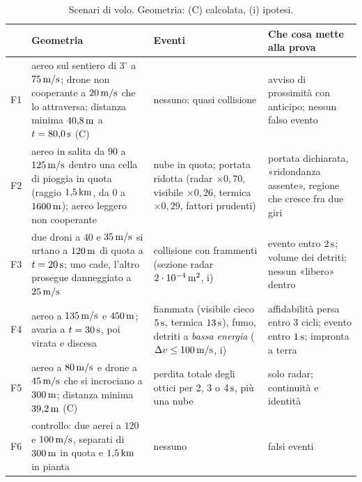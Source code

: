 \begin{table}[H]\centering\footnotesize
\caption{Scenari di volo. Geometria: (C) calcolata, (i) ipotesi.}\label{tab:vo-scenari}
\begin{tabularx}{\linewidth}{@{}p{0.6cm}>{\RaggedRight\arraybackslash}p{6.4cm}>{\RaggedRight\arraybackslash}p{3.2cm}L@{}}
\toprule
& Geometria & Eventi & Che cosa mette alla prova\\
\midrule
F1 & aereo sul sentiero di $3^\circ$ a $75\,\mathrm{m/s}$; drone non cooperante a $20\,\mathrm{m/s}$ che lo attraversa; distanza minima $40{,}8\,\mathrm{m}$ a $t=80{,}0\,\mathrm{s}$ (C) & nessuno: quasi collisione & avviso di prossimità con anticipo; nessun falso evento\\
F2 & aereo in salita da $90$ a $125\,\mathrm{m/s}$ dentro una cella di pioggia in quota (raggio $1{,}5\,\mathrm{km}$, da $0$ a $1600\,\mathrm{m}$); aereo leggero non cooperante & nube in quota; portata ridotta (radar $\times0{,}70$, visibile $\times0{,}26$, termica $\times0{,}29$, fattori prudenti) & portata dichiarata, «ridondanza assente», regione che cresce fra due giri\\
F3 & due droni a $40$ e $35\,\mathrm{m/s}$ si urtano a $120\,\mathrm{m}$ di quota a $t=20\,\mathrm{s}$; uno cade, l'altro prosegue danneggiato a $25\,\mathrm{m/s}$ & collisione con frammenti (sezione radar $2\cdot10^{-4}\,\mathrm{m^2}$, i) & evento entro $2\,\mathrm{s}$; volume dei detriti; nessun «libero» dentro\\
F4 & aereo a $135\,\mathrm{m/s}$ e $450\,\mathrm{m}$; avaria a $t=30\,\mathrm{s}$, poi virata e discesa & fiammata (visibile cieco $5\,\mathrm{s}$, termica $13\,\mathrm{s}$), fumo, detriti a \emph{bassa energia} ($\Delta v\le100\,\mathrm{m/s}$, i) & affidabilità persa entro 3 cicli; evento entro $1\,\mathrm{s}$; impronta a terra\\
F5 & aereo a $80\,\mathrm{m/s}$ e drone a $45\,\mathrm{m/s}$ che si incrociano a $300\,\mathrm{m}$; distanza minima $39{,}2\,\mathrm{m}$ (C) & perdita totale degli ottici per 2, 3 o $4\,\mathrm{s}$, più una nube & solo radar; continuità e identità\\
F6 & controllo: due aerei a $120$ e $100\,\mathrm{m/s}$, separati di $300\,\mathrm{m}$ in quota e $1{,}5\,\mathrm{km}$ in pianta & nessuno & falsi eventi\\
\bottomrule
\end{tabularx}
\end{table}

